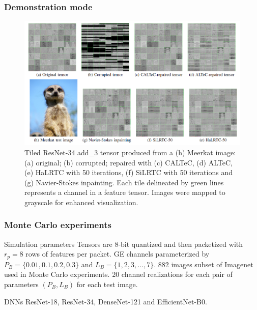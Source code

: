 \documentclass[aspectratio=169]{beamer}
\begin{document}
\begin{frame}
\frametitle{Demonstration mode}
	\begin{figure}[H]
		\centering
		\includegraphics[scale=0.33]{vcipfig.png}
		\caption{Tiled ResNet-34 add\_3 tensor produced from a (h) Meerkat image: (a) original; (b) corrupted; repaired with (c) CALTeC, (d) ALTeC, (e) HaLRTC with 50 iterations, (f) SiLRTC with 50 iterations and (g) Navier-Stokes inpainting. Each tile delineated by green lines represents a channel in a feature tensor. Images were mapped to grayscale for enhanced visualization.}
	\end{figure}
\end{frame}

\begin{frame}
	\frametitle{Monte Carlo experiments}
	\begin{block}{Simulation parameters}
		Tensors are 8-bit quantized and then packetized with $r_p =8$ rows of features per packet. GE channels parameterized by $P_B = \{0.01,0.1,0.2,0.3\}$ and $L_B = \{1,2,3,\dots,7\}$. 882 images subset of Imagenet used in Monte Carlo experiments. 20 channel realizations for each pair of parameters $(P_B,L_B)$ for each test image.
	\end{block}
\begin{block}{DNNs}
	ResNet-18, ResNet-34, DenseNet-121 and EfficientNet-B0.
\end{block}
\end{frame}
\end{document}
